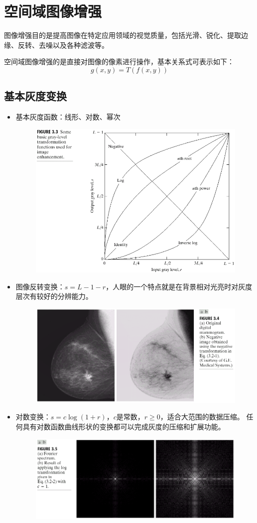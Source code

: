 
\section{空间域图像增强} %
图像增强目的是提高图像在特定应用领域的视觉质量，包括光滑、锐化、提取边缘、反转、去噪以及各种滤波等。

空间域图像增强的是直接对图像的像素进行操作，基本关系式可表示如下：
\[g(x,y)=T(f(x,y))\]

\subsection{基本灰度变换}
\begin{itemize}
\item 基本灰度函数：线形、对数、幂次
\begin{figure}[H]
\centering
\includegraphics[width=0.6\linewidth]{fig/enhancement.png}
\end{figure}
\item 图像反转变换：$s=L-1-r$，人眼的一个特点就是在背景相对光亮时对灰度层次有较好的分辨能力。
\begin{figure}[H]
\centering
\includegraphics[width=0.6\linewidth]{fig/trans-inverse.png}
\end{figure}
\item 对数变换：$s=c\log(1+r)$，$c$是常数，$r\geq 0$，适合大范围的数据压缩。
任何具有对数函数曲线形状的变换都可以完成灰度的压缩和扩展功能。 
\begin{figure}[H]
\centering
\includegraphics[width=0.6\linewidth]{fig/trans-log.png}

\end{figure}
\end{itemize}
